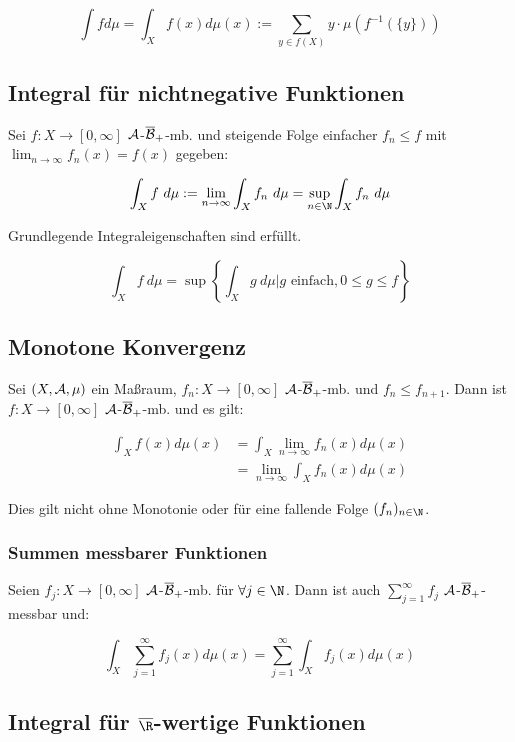 \[ \int f d\mu = \int_X f(x) d\mu(x) := \sum_{y \in f(X)} y \cdot \mu(f^{-1}(\{y\})) \]

\subsection*{Integral für nichtnegative Funktionen}

Sei $f : X \to [0, \infty]$ $\mathcal{A}$-$\overline{\mathcal{B}}_+$-mb. und steigende Folge einfacher $f_n \leq f$ mit $\displaystyle\lim_{n \to \infty} f_n(x) = f(x)$ gegeben:

\vspace{-2mm}
\[ \int_X f \ d\mu := \lim_{n \to \infty} \int_X f_n \ d\mu = \sup_{n \in \N} \int_X f_n \ d\mu \]

Grundlegende Integraleigenschaften sind erfüllt.

\vspace{-4mm}
\[ \int_X f \ d\mu = \sup\left\{ \int_X g \ d\mu | g \text{ einfach}, 0 \leq g \leq f \right\} \]

\subsection*{Monotone Konvergenz}

Sei $(X, \mathcal{A}, \mu)$ ein Maßraum, $f_n : X \to [0,\infty]$ $\mathcal{A}$-$\overline{\mathcal{B}}_+$-mb. und $f_n \leq f_{n+1}$. Dann ist $f : X \to [0,\infty]$ $\mathcal{A}$-$\overline{\mathcal{B}}_+$-mb. und es gilt:

\vspace{-4mm}
\begin{align*}
	\int_X f(x) d\mu(x) &= \int_X \lim_{n \to \infty} f_n(x) d\mu(x)\\
	               &= \lim_{n \to \infty} \int_X f_n(x) d\mu(x)
\end{align*}

Dies gilt nicht ohne Monotonie oder für eine fallende Folge $(f_n)_{n \in \N}$.

\subsubsection*{Summen messbarer Funktionen}

Seien $f_j : X \to [0,\infty]$ $\mathcal{A}$-$\overline{\mathcal{B}}_+$-mb. für $\forall j \in \N$. Dann ist auch $\sum_{j=1}^\infty f_j$ $\mathcal{A}$-$\overline{\mathcal{B}}_+$-messbar und:

\[ \int_X \sum_{j=1}^\infty f_j(x) d\mu(x) = \sum_{j=1}^\infty \int_X f_j(x) d\mu(x) \]

\subsection*{Integral für $\overline\R$-wertige Funktionen}

